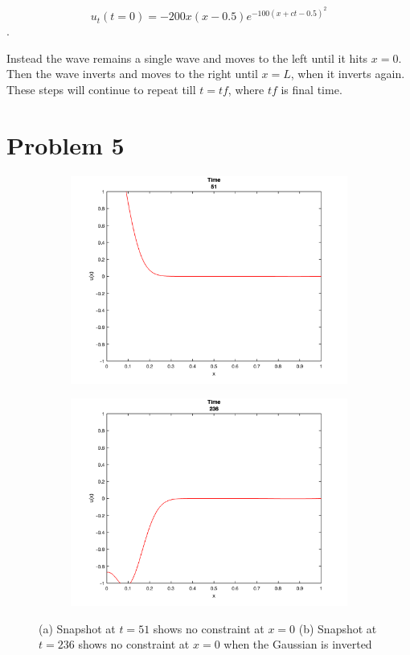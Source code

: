 \documentclass[12pt]{article}
\begin{document}
$$
u_{t}(t = 0) = -200x(x - 0.5)e^{-100(x + ct - 0.5)^2}
$$.

Instead the wave remains a single wave and moves to the left until it hits $x = 0$. Then the wave inverts and moves to the right until $x = L$, when it inverts again. These steps will continue to repeat till $t = tf$, where $tf$ is final time.

\clearpage

\section*{Problem 5}

\begin{figure}[h!]
\centering

\begin{subfigure}{0.49\columnwidth}
\centering
\includegraphics[width=\textwidth]{problem_5_1.png}
\label{fig:time1}
\end{subfigure}\hfill
\begin{subfigure}{0.49\columnwidth}
\centering
\includegraphics[width=\textwidth]{problem_5_2.png}
\end{subfigure}
\caption{(a) Snapshot at $t = 51$ shows no constraint at $x = 0$ (b) Snapshot at $t = 236$ shows no constraint at $x = 0$ when the Gaussian is inverted}
\end{figure}
\end{document}
